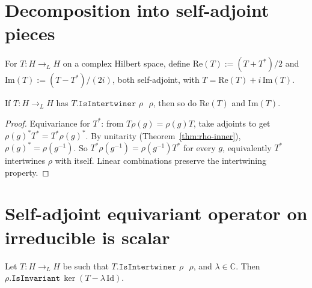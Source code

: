 \section{Decomposition into self-adjoint pieces}

\begin{definition}
  \label{def:RealImag}
  For $T : H \to_L H$ on a complex Hilbert space, define
  $\mathrm{Re}(T) := (T + T^*)/2$ and $\mathrm{Im}(T) := (T - T^*)/(2i)$,
  both self-adjoint, with $T = \mathrm{Re}(T) + i\,\mathrm{Im}(T)$.
\end{definition}

\begin{theorem}
  \label{thm:RealImag-equiv}
  \leanok
  If $T : H \to_L H$ has $T.\texttt{IsIntertwiner $\rho$ $\rho$}$, then
  so do $\mathrm{Re}(T)$ and $\mathrm{Im}(T)$.
\end{theorem}

\begin{proof}
  Equivariance for $T^*$: from
  $T \rho(g) = \rho(g) T$, take adjoints to get
  $\rho(g)^* T^* = T^* \rho(g)^*$. By unitarity (Theorem~\ref{thm:rho-inner}),
  $\rho(g)^* = \rho(g^{-1})$. So $T^* \rho(g^{-1}) = \rho(g^{-1}) T^*$
  for every $g$, equivalently $T^*$ intertwines $\rho$ with itself.
  Linear combinations preserve the intertwining property.
\end{proof}

\section{Self-adjoint equivariant operator on irreducible is scalar}

\begin{theorem}
  \label{thm:eigenspace-invariant}
  \leanok
  Let $T : H \to_L H$ be such that $T.\texttt{IsIntertwiner $\rho$ $\rho$}$,
  and $\lambda \in \mathbb C$. Then $\rho.\texttt{IsInvariant}\,\ker(T - \lambda\,\mathrm{Id})$.
\end{theorem}

